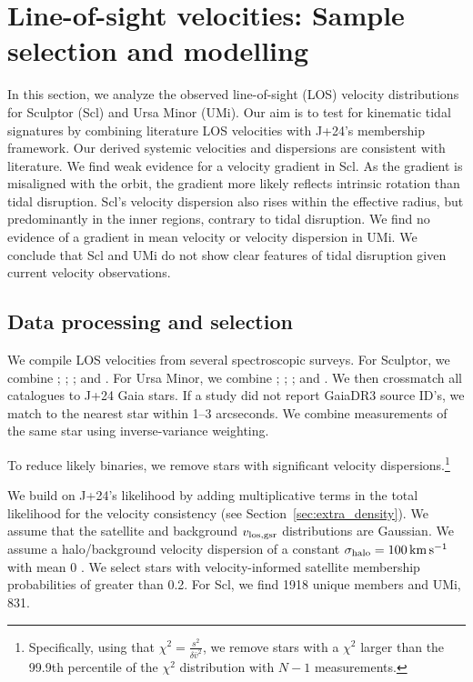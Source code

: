 \chapter{Line-of-sight velocities: Sample selection and
modelling}\label{sec:extra_rv_models}

In this section, we analyze the observed line-of-sight (LOS) velocity
distributions for Sculptor (Scl) and Ursa Minor (UMi). Our aim is to
test for kinematic tidal signatures by combining literature LOS
velocities with J+24's membership framework. Our derived systemic
velocities and dispersions are consistent with literature. We find weak
evidence for a velocity gradient in Scl. As the gradient is misaligned
with the orbit, the gradient more likely reflects intrinsic rotation
than tidal disruption. Scl's velocity dispersion also rises within the
effective radius, but predominantly in the inner regions, contrary to
tidal disruption. We find no evidence of a gradient in mean velocity or
velocity dispersion in UMi. We conclude that Scl and UMi do not show
clear features of tidal disruption given current velocity observations.

\section{Data processing and
selection}\label{data-processing-and-selection}

We compile LOS velocities from several spectroscopic surveys. For
Sculptor, we combine \citet{tolstoy+2023}; \citet{walker+2009};
\citet{sestito+2023a}; and \apogee{} \citep[DR17,][]{abdurrouf+2022}.
For Ursa Minor, we combine \citet{spencer+2018}; \citet{pace+2020};
\citet{sestito+2023b}; and \apogee{}. We then crossmatch all catalogues
to J+24 Gaia stars. If a study did not report GaiaDR3 source ID's, we
match to the nearest star within 1--3 arcseconds. We combine
measurements of the same star using inverse-variance weighting.

To reduce likely binaries, we remove stars with significant velocity
dispersions.\footnote{Specifically, using that
  \(\chi^2=\frac{s^2}{\delta \bar v^2}\), we remove stars with a
  \(\chi^2\) larger than the 99.9th percentile of the \(\chi^2\)
  distribution with \(N-1\) measurements.}

We build on J+24's likelihood by adding multiplicative terms in the
total likelihood for the velocity consistency (see
Section~\ref{sec:extra_density}). We assume that the satellite and
background \(v_{\rm los, gsr}\) distributions are Gaussian. We assume a
halo/background velocity dispersion of a constant
\(\sigma_{\rm halo} = 100\,{\rm km\,s^{-1}}\) with mean 0
\citep[e.g.][]{brown+2010}. We select stars with velocity-informed
satellite membership probabilities of greater than 0.2. For Scl, we find
1918 unique members and UMi, 831.

